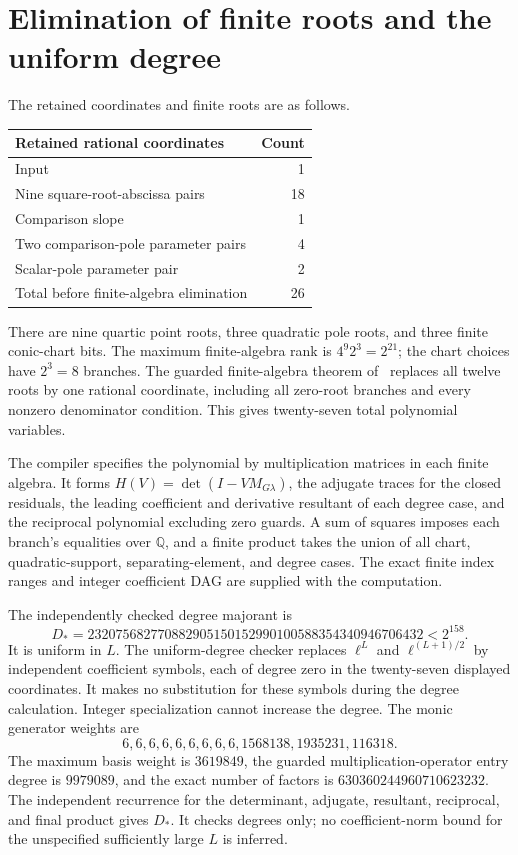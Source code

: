 \documentclass[11pt,a4paper]{article}
\newcommand{\Q}{\mathbb Q}\newcommand{\Z}{\mathbb Z}
\begin{document}
\section{Elimination of finite roots and the uniform degree}

The retained coordinates and finite roots are as follows.
\begin{center}
\begin{tabular}{lr}
\toprule
Retained rational coordinates & Count\\
\midrule
Input & 1\\
Nine square-root-abscissa pairs & 18\\
Comparison slope & 1\\
Two comparison-pole parameter pairs & 4\\
Scalar-pole parameter pair & 2\\
\midrule
Total before finite-algebra elimination & 26\\
\bottomrule
\end{tabular}
\end{center}
There are nine quartic point roots, three quadratic pole roots,
and three finite conic-chart bits. The maximum finite-algebra
rank is $4^9 2^3=2^{21}$; the chart choices have $2^3=8$
branches. The guarded finite-algebra theorem of~\cite{Baseline}
replaces all twelve roots by one rational coordinate, including
all zero-root branches and every nonzero denominator condition.
This gives twenty-seven total polynomial variables.

The compiler specifies the polynomial by multiplication matrices
in each finite algebra. It forms
$H(V)=\det(I-VM_{G\lambda})$, the adjugate traces for the
closed residuals, the leading coefficient and derivative
resultant of each degree case, and the reciprocal polynomial
excluding zero guards. A sum of squares imposes each branch's
equalities over $\Q$, and a finite product takes the union of
all chart, quadratic-support, separating-element, and degree
cases. The exact finite index ranges and integer coefficient
DAG are supplied with the computation.

The independently checked degree majorant is
\[
 D_*=232075682770882905150152990100588354340946706432
       <2^{158}.
\]
It is uniform in $L$. The uniform-degree checker replaces
$\ell^L$ and $\ell^{(L+1)/2}$ by independent coefficient
symbols, each of degree zero in the twenty-seven displayed
coordinates. It makes no substitution for these symbols during
the degree calculation. Integer specialization cannot increase
the degree. The monic generator weights are
\[
 6,6,6,6,6,6,6,6,6,1568138,1935231,116318.
\]
The maximum basis weight is $3619849$, the guarded
multiplication-operator entry degree is $9979089$, and
the exact number of factors is $630360244960710623232$.
The independent recurrence for the determinant, adjugate,
resultant, reciprocal, and final product gives $D_*$.
It checks degrees only; no coefficient-norm bound for the
unspecified sufficiently large $L$ is inferred.
\end{document}
